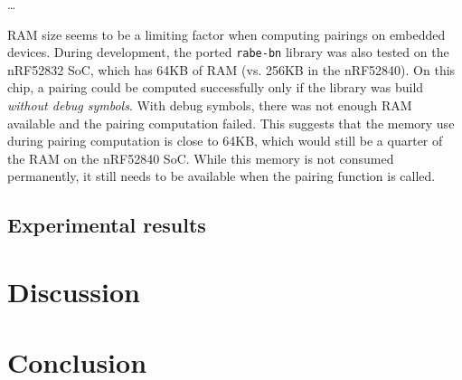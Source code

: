 \dots 

RAM size seems to be a limiting factor when computing pairings on embedded devices.
During development, the ported \texttt{rabe-bn} library was also tested on the nRF52832 SoC, which has 64KB of RAM (vs. 256KB in the nRF52840). 
On this chip, a pairing could be computed successfully only if the library was build \emph{without debug symbols}.
With debug symbols, there was not enough RAM available and the pairing computation failed.
This suggests that the memory use during pairing computation is close to 64KB, which would still be a quarter of the RAM on the nRF52840 SoC.
While this memory is not consumed permanently, it still needs to be available when the pairing function is called.

\section{Experimental results}

\chapter{Discussion}

\chapter{Conclusion}
